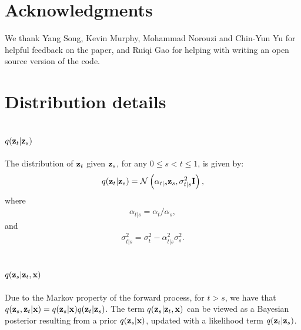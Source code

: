 \documentclass{article}
\begin{document}
%

%

\section*{Acknowledgments}
We thank Yang Song, Kevin Murphy, Mohammad Norouzi and Chin-Yun Yu for helpful feedback on the paper, and Ruiqi Gao for helping with writing an open source version of the code.

%

%

%

%

%
%

%

 
%
%
%

%
%
%
%
%
%
%
%
%
%
%
%
%
%
%
%

%

%
%
%
%
%
%
%
%
%
%
%

%
%
%
%
%
%
%

%
%
%
%
%
%
%
%
%
%
%

%
%
%
%
%
%
%
%
%
%
%
%
%

%
%
%
%
%
%
%
%
%

%

\vfill
\pagebreak
\appendix

\section{Distribution details}
\label{sec:distributions}

\subsection{$q({\mathbf{z}}_t|{\mathbf{z}}_s)$}
The distribution of ${\mathbf{z}}_t$ given ${\mathbf{z}}_s$, for any $0 \leq s < t \leq 1$, is given by:
\begin{align}
q({\mathbf{z}}_t|{\mathbf{z}}_s) = \mathcal{N}\left(\alpha_{t|s} {\mathbf{z}}_s, \sigma^2_{t|s} \mathbf{I}\right),
\label{eq:zt_given_zs}
\end{align}
where
\begin{align}
\alpha_{t|s} = \alpha_t/\alpha_s,
\end{align}
and
\begin{align}
\sigma_{t|s}^2 = \sigma_t^2 - \alpha_{t|s}^2\sigma_s^2.
\end{align}

%
%
%
%
%
%
%
%

\subsection{$q({\mathbf{z}}_s|{\mathbf{z}}_t,{\mathbf{x}})$}
Due to the Markov property of the forward process, for $t > s$, we have that $q({\mathbf{z}}_s, {\mathbf{z}}_t | {\mathbf{x}}) = q({\mathbf{z}}_s | {\mathbf{x}}) q({\mathbf{z}}_t | {\mathbf{z}}_s)$.
The term $q({\mathbf{z}}_s|{\mathbf{z}}_t,{\mathbf{x}})$ can be viewed as a Bayesian posterior resulting from a prior $q({\mathbf{z}}_s|{\mathbf{x}})$, updated with a likelihood term $q({\mathbf{z}}_t|{\mathbf{z}}_s)$.
\end{document}

